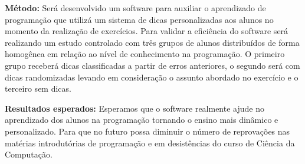 \documentclass[12pt,english,brazil,a4paper,utf8,oneside]{utfpr-tcc}
\begin{document}
\begin{resumo}
\begin{itemize}
\end{itemize}

\textbf{Método:} Será desenvolvido um software para auxiliar o aprendizado de programação que utilizá um sistema de dicas personalizadas aos alunos no momento da realização de exercícios. Para validar a eficiência do software será realizando um estudo controlado com três grupos de alunos distribuídos de forma homogênea em relação ao nível de conhecimento na programação. O primeiro grupo receberá dicas classificadas a partir de erros anteriores, o segundo será com dicas randomizadas levando em consideração o assunto abordado no exercício e o terceiro sem dicas.

\textbf{Resultados esperados:} Esperamos que o software realmente ajude no aprendizado dos alunos na programação tornando o ensino mais dinâmico e personalizado. Para que no futuro possa diminuir o número de reprovações nas matérias introdutórias de programação e em desistências do curso de Ciência da Computação.

\end{resumo}







\listoffigures
\listoftables

\tableofcontents

\mainmatter



% 



\backmatter
\end{document}
